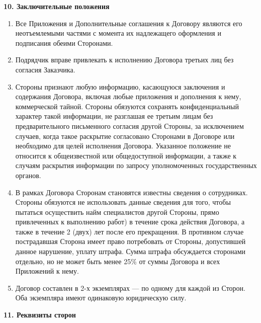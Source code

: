 \documentclass[a4paper, fontsize=12bp]{article}
\newcounter{enum}
\begin{document}
\begin{center}
\textbf{10. Заключительные положения}
\end{center}
\begin{enumerate}[label=\arabic{enum}.\arabic*.]
\item Все Приложения и Дополнительные соглашения к Договору являются его неотъемлемыми частями с момента их надлежащего оформления и подписания обеими Сторонами.

\item Подрядчик вправе привлекать к исполнению Договора третьих лиц без согласия Заказчика.

\item Стороны признают любую информацию, касающуюся заключения и содержания Договора, включая любые приложения и дополнения к нему, коммерческой тайной. Стороны обязуются сохранять конфиденциальный характер такой информации, не разглашая ее третьим лицам без предварительного письменного согласия другой Стороны, за исключением случаев, когда такое раскрытие согласовано Сторонами в Договоре или необходимо для целей исполнения Договора. Указанное положение не относится к общеизвестной или общедоступной информации, а также к случаям раскрытия информации по запросу уполномоченных государственных органов.

\item В рамках Договора Сторонам становятся известны сведения о сотрудниках. Стороны обязуются не использовать данные сведения для того, чтобы пытаться осуществить найм специалистов другой Стороны, прямо привлеченных к выполнению работ) в течение срока действия Договора, а также в течение 2 (двух) лет после его прекращения. В противном случае пострадавшая Сторона имеет право потребовать от Стороны, допустившей данное нарушение, уплату штрафа. Сумма штрафа обсуждается сторонами отдельно, но не может быть менее 25\% от суммы Договора и всех Приложений к нему.

\item Договор составлен в 2-х экземплярах — по одному для каждой из Сторон. Оба экземпляра имеют одинаковую юридическую силу.
\end{enumerate}

\newpage
\begin{center}
\textbf{11. Реквизиты сторон}
\vspace{\baselineskip}
\end{center}
\end{document}
